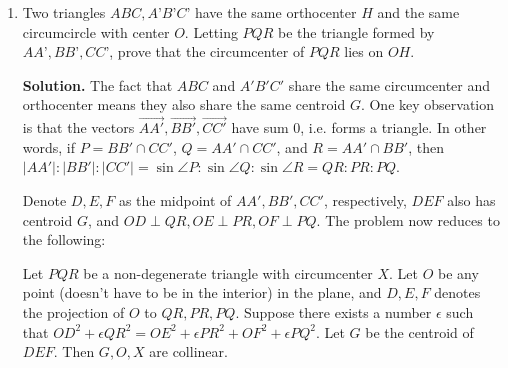 \documentclass[11pt,a4paper]{article}
\begin{document}
\begin{enumerate}
    	\item [G7.]
    	Two triangles $ABC, A’B’C’$ have the same orthocenter $H$ and the same circumcircle with center $O$. 
    	Letting $PQR$ be the triangle formed by $AA’, BB’, CC’$, prove that the circumcenter of $PQR$ lies on $OH$.
    	
    	\textbf{Solution.} 
    	The fact that $ABC$ and $A'B'C'$ share the same circumcenter and orthocenter means they also share the same centroid $G$. One key observation is that the vectors $\vec{AA'}, \vec{BB'}, \vec{CC'}$ have sum 0, i.e. forms a triangle. In other words, if $P=BB'\cap CC'$, $Q=AA'\cap CC'$, and $R=AA'\cap BB'$, then $|AA'|:|BB'|: |CC'|=\sin\angle P:\sin\angle Q: \sin\angle R=QR:PR:PQ$.
    	
    	Denote $D, E, F$ as the midpoint of $AA', BB', CC'$, respectively, $DEF$ also has centroid $G$, and $OD\perp QR, OE\perp PR, OF\perp PQ$. The problem now reduces to the following:
    	
    	Let $PQR$ be a non-degenerate triangle with circumcenter $X$. Let $O$ be any point (doesn't have to be in the interior) in the plane, and $D, E, F$ denotes the projection of $O$ to $QR, PR, PQ$. Suppose there exists a number $\epsilon$ such that $OD^2+\epsilon QR^2 = OE^2 + \epsilon PR^2 + OF^2+\epsilon PQ^2$. Let $G$ be the centroid of $DEF$. Then $G, O, X$ are collinear.
    	

\end{enumerate}
\end{document}
